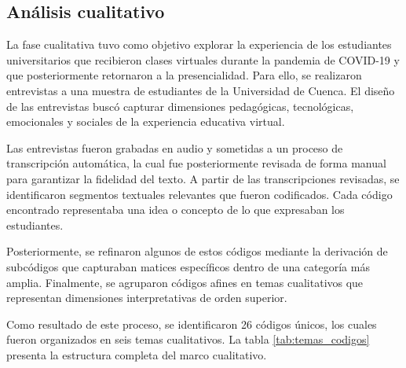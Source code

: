 \documentclass[conference]{IEEEtran}
\begin{document}
\subsection{Análisis cualitativo}

La fase cualitativa tuvo como objetivo explorar la experiencia de los estudiantes universitarios que recibieron clases virtuales durante la pandemia de COVID-19 y que posteriormente retornaron a la presencialidad. Para ello, se realizaron entrevistas a una muestra de estudiantes de la Universidad de Cuenca. El diseño de las entrevistas buscó capturar dimensiones pedagógicas, tecnológicas, emocionales y sociales de la experiencia educativa virtual.

Las entrevistas fueron grabadas en audio y sometidas a un proceso de transcripción automática, la cual fue posteriormente revisada de forma manual para garantizar la fidelidad del texto. A partir de las transcripciones revisadas, se identificaron segmentos textuales relevantes que fueron codificados. Cada código encontrado representaba una idea o concepto de lo que expresaban los estudiantes.

Posteriormente, se refinaron algunos de estos códigos mediante la derivación de subcódigos que capturaban matices específicos dentro de una categoría más amplia. Finalmente, se agruparon códigos afines en temas cualitativos que representan dimensiones interpretativas de orden superior.

Como resultado de este proceso, se identificaron 26 códigos únicos, los cuales fueron organizados en seis temas cualitativos. La tabla \ref{tab:temas_codigos} presenta la estructura completa del marco cualitativo.
\end{document}
